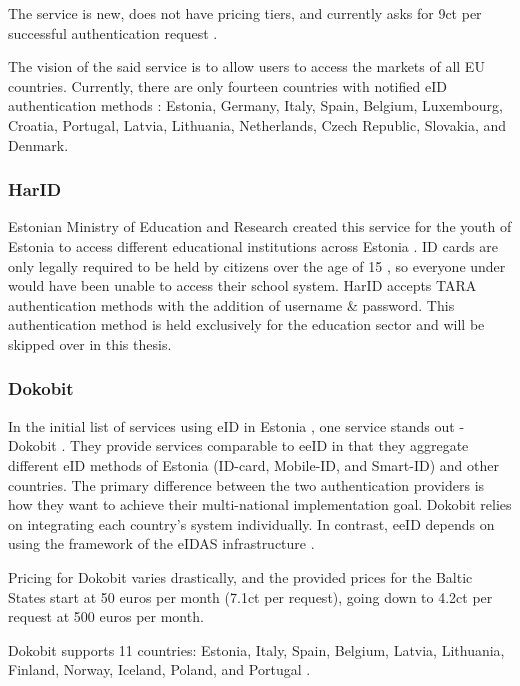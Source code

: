 The service is new, does not have pricing tiers, and currently asks for 9ct per successful authentication request \cite{eeid-pricing}.

The vision of the said service is to allow users to access the markets of all EU countries. Currently, there are only fourteen countries with notified eID authentication methods \cite{eulaw-eidas-notified}: Estonia, Germany, Italy, Spain, Belgium, Luxembourg, Croatia, Portugal, Latvia, Lithuania, Netherlands, Czech Republic, Slovakia, and Denmark.

\subsubsection{HarID}

Estonian Ministry of Education and Research created this service for the youth of Estonia to access different educational institutions across Estonia \cite{harid}. ID cards are only legally required to be held by citizens over the age of 15 \cite{eelaw-idcard}, so everyone under would have been unable to access their school system. HarID accepts TARA authentication methods with the addition of username \& password. This authentication method is held exclusively for the education sector and will be skipped over in this thesis.

\subsubsection{Dokobit}

In the initial list of services using eID in Estonia \cite{ut-eidinestonia}, one service stands out - Dokobit \cite{dokobit}. They provide services comparable to eeID in that they aggregate different eID methods of Estonia (ID-card, Mobile-ID, and Smart-ID) and other countries. The primary difference between the two authentication providers is how they want to achieve their multi-national implementation goal. Dokobit relies on integrating each country's system individually. In contrast, eeID depends on using the framework of the eIDAS infrastructure \cite{eeid}.

Pricing for Dokobit varies drastically, and the provided prices for the Baltic States \cite{dokobit-pricing} start at 50 euros per month (7.1ct per request), going down to 4.2ct per request at 500 euros per month.

Dokobit supports 11 countries: Estonia, Italy, Spain, Belgium, Latvia, Lithuania, Finland, Norway, Iceland, Poland, and Portugal \cite{dokobit}.


